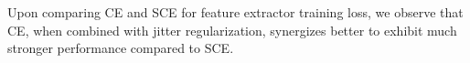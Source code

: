 \documentclass{article}
\def\eg{\textit{e.g}., } \def\Eg{\textit{E.g}., }
\theoremstyle{plain}
\theoremstyle{definition}
\theoremstyle{remark}
\begin{document}
Upon comparing CE and SCE for feature extractor training loss, we observe that CE, when combined with jitter regularization, synergizes better to exhibit much stronger performance compared to SCE.




\end{document}
